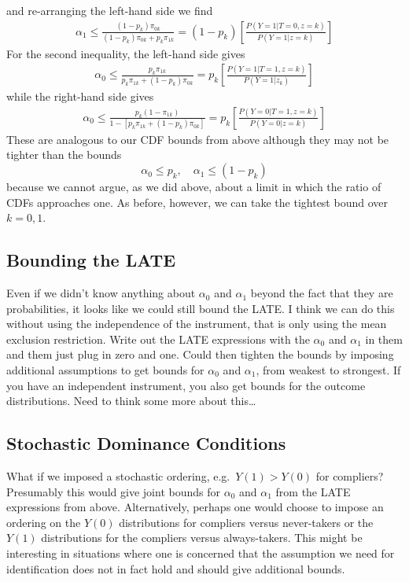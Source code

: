 \documentclass[12pt]{article}
\begin{document}
and re-arranging the left-hand side we find
\begin{align*}
  \alpha_1 \leq \frac{(1 - p_k)\pi_{0k}}{(1 - p_k)\pi_{0k} + p_k \pi_{1k}} = (1 - p_k) \left[ \frac{P(Y=1|T=0,z=k)}{P(Y=1|z=k)} \right]
\end{align*}
For the second inequality, the left-hand side gives
\begin{align*}
  \alpha_0 \leq \frac{p_k \pi_{1k}}{p_k \pi_{1k} + (1 - p_k)\pi_{0k}} = p_k \left[ \frac{P(Y=1|T=1,z=k)}{P(Y=1|z_k)} \right] 
\end{align*}
while the right-hand side gives
\begin{align*}
  \alpha_0 \leq \frac{p_k (1 - \pi_{1k})}{1 - \left[ p_k \pi_{1k} + (1 - p_k) \pi_{0k} \right]} = p_k \left[ \frac{P(Y=0|T=1,z=k)}{P(Y=0|z=k)} \right]
\end{align*}
These are analogous to our CDF bounds from above although they may not be tighter than the bounds 
\[
  \alpha_0 \leq p_k, \quad \alpha_1 \leq (1 - p_k)
\]
because we cannot argue, as we did above, about a limit in which the ratio of CDFs approaches one.
As before, however, we can take the tightest bound over $k = 0, 1$.

\subsection{Bounding the LATE}
Even if we didn't know anything about $\alpha_0$ and $\alpha_1$ beyond the fact that they are probabilities, it looks like we could still bound the LATE.
I think we can do this without using the independence of the instrument, that is only using the mean exclusion restriction.
Write out the LATE expressions with the $\alpha_0$ and $\alpha_1$ in them and them just plug in zero and one.
Could then tighten the bounds by imposing additional assumptions to get bounds for $\alpha_0$ and $\alpha_1$, from weakest to strongest.
If you have an independent instrument, you also get bounds for the outcome distributions.
Need to think some more about this\ldots


\subsection{Stochastic Dominance Conditions}
What if we imposed a stochastic ordering, e.g.\ $Y(1) > Y(0)$ for compliers?
Presumably this would give joint bounds for $\alpha_0$ and $\alpha_1$ from the LATE expressions from above.
Alternatively, perhaps one would choose to impose an ordering on the $Y(0)$ distributions for compliers versus never-takers or the $Y(1)$ distributions for the compliers versus always-takers.
This might be interesting in situations where one is concerned that the assumption we need for identification does not in fact hold and should give additional bounds.
\end{document}
